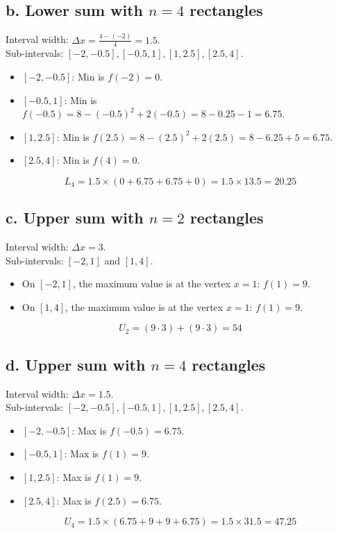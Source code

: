 \documentclass[12pt]{article}
\begin{document}
\subsection*{b. Lower sum with $n=4$ rectangles}
Interval width: $\Delta x = \frac{4 - (-2)}{4} = 1.5$. \\
Sub-intervals: $[-2, -0.5], [-0.5, 1], [1, 2.5], [2.5, 4]$.
\begin{itemize}
    \item $[-2, -0.5]$: Min is $f(-2) = 0$.
    \item $[-0.5, 1]$: Min is $f(-0.5) = 8 - (-0.5)^2 + 2(-0.5) = 8 - 0.25 - 1 = 6.75$.
    \item $[1, 2.5]$: Min is $f(2.5) = 8 - (2.5)^2 + 2(2.5) = 8 - 6.25 + 5 = 6.75$.
    \item $[2.5, 4]$: Min is $f(4) = 0$.
\end{itemize}
\[ L_4 = 1.5 \times (0 + 6.75 + 6.75 + 0) = 1.5 \times 13.5 = 20.25 \]

\subsection*{c. Upper sum with $n=2$ rectangles}
Interval width: $\Delta x = 3$. \\
Sub-intervals: $[-2, 1]$ and $[1, 4]$.
\begin{itemize}
    \item On $[-2, 1]$, the maximum value is at the vertex $x=1$: $f(1) = 9$.
    \item On $[1, 4]$, the maximum value is at the vertex $x=1$: $f(1) = 9$.
\end{itemize}
\[ U_2 = (9 \cdot 3) + (9 \cdot 3) = 54 \]

\subsection*{d. Upper sum with $n=4$ rectangles}
Interval width: $\Delta x = 1.5$. \\
Sub-intervals: $[-2, -0.5], [-0.5, 1], [1, 2.5], [2.5, 4]$.
\begin{itemize}
    \item $[-2, -0.5]$: Max is $f(-0.5) = 6.75$.
    \item $[-0.5, 1]$: Max is $f(1) = 9$.
    \item $[1, 2.5]$: Max is $f(1) = 9$.
    \item $[2.5, 4]$: Max is $f(2.5) = 6.75$.
\end{itemize}
\[ U_4 = 1.5 \times (6.75 + 9 + 9 + 6.75) = 1.5 \times 31.5 = 47.25 \]
\end{document}

